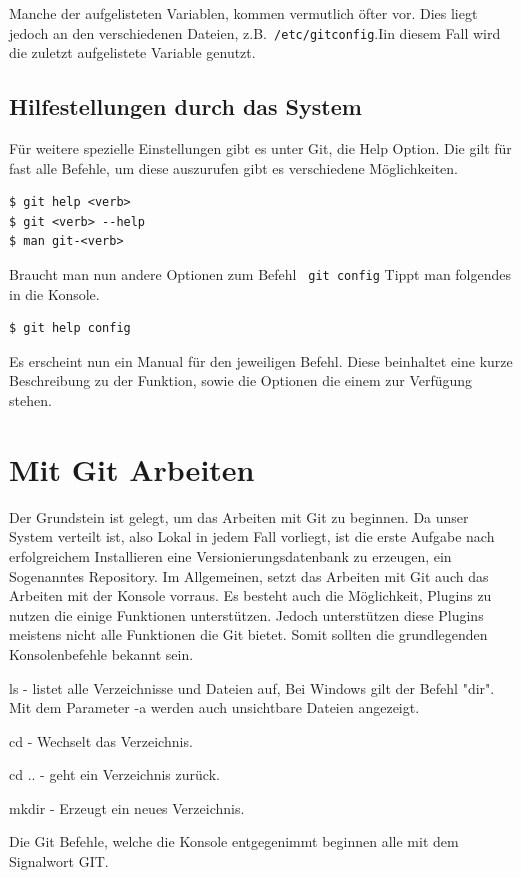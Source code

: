 \documentclass[12pt,a4paper,bibliography=totocnumbered,listof=totocnumbered]{scrartcl}
\begin{document}
Manche der aufgelisteten Variablen, kommen vermutlich öfter vor. Dies liegt jedoch an den verschiedenen Dateien, z.B.\lstinline| /etc/gitconfig|.Iin diesem Fall wird die zuletzt aufgelistete Variable genutzt.

\subsection{Hilfestellungen durch das System}
Für weitere spezielle Einstellungen gibt es unter Git, die Help Option.
Die gilt für fast alle Befehle, um diese auszurufen gibt es verschiedene Möglichkeiten.
\begin{lstlisting}
$ git help <verb>
$ git <verb> --help
$ man git-<verb>
\end{lstlisting} 

Braucht man nun andere Optionen zum Befehl \lstinline| git config| Tippt man folgendes in die Konsole. 
\begin{lstlisting}
$ git help config
\end{lstlisting}
Es erscheint nun ein Manual für den jeweiligen Befehl. Diese beinhaltet eine kurze Beschreibung zu der Funktion, sowie die Optionen die einem zur Verfügung stehen.  
  


\section{Mit Git Arbeiten }

Der Grundstein ist gelegt, um das Arbeiten mit Git zu beginnen. Da unser System verteilt ist, also Lokal in jedem Fall vorliegt, ist die erste Aufgabe nach erfolgreichem Installieren eine Versionierungsdatenbank zu erzeugen, ein Sogenanntes Repository. Im Allgemeinen, setzt das Arbeiten mit Git auch das Arbeiten mit der Konsole vorraus. Es besteht auch die Möglichkeit, Plugins zu nutzen die einige Funktionen unterstützen. Jedoch unterstützen diese Plugins meistens nicht alle Funktionen die Git bietet. Somit sollten die grundlegenden Konsolenbefehle bekannt sein.  
\begin{compactitem}
	\item ls - listet alle Verzeichnisse und Dateien auf, Bei Windows gilt der Befehl "dir". Mit dem Parameter -a werden auch unsichtbare Dateien angezeigt. 
	\item cd - Wechselt das Verzeichnis.
	\item cd .. - geht ein Verzeichnis zurück.
	\item mkdir - Erzeugt ein neues Verzeichnis. 
\end{compactitem}
Die Git Befehle, welche die Konsole entgegenimmt beginnen alle mit dem Signalwort GIT.  
\newpage 
\end{document}
